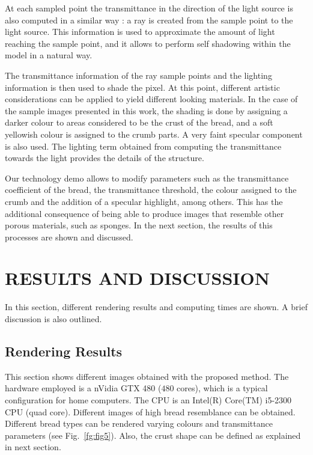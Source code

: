\documentclass[oneside,a4paper,english,links]{amca}
\begin{document}
At each sampled point the transmittance in the direction of the light
source is also computed in a similar way : a ray is created from the
sample point to the light source. This information is used to
approximate the amount of light reaching the sample point, and it
allows to perform self shadowing within the model in a natural
way. 

The transmittance information of the ray sample points and the
lighting information is then used to shade the pixel. At this point,
different artistic considerations can be applied to yield different
looking materials. In the case of the sample images presented
in this work, the shading is done by assigning a darker colour to areas
considered to be the crust of the bread, and a soft yellowish colour is
assigned to the crumb parts. A very faint specular component is also
used. The lighting term obtained from computing the transmittance
towards the light provides the details of the structure.

Our technology demo allows to modify parameters such as the
transmittance coefficient of the bread, the transmittance
threshold, the colour assigned to the crumb and the addition of a
specular highlight, among others. This has the additional consequence
of being able to produce images that resemble other porous materials,
such as sponges. In the next section, the results of this processes are shown and discussed.


\section{RESULTS AND DISCUSSION}

In this section, different rendering results and computing times are shown. A brief discussion is also outlined.

\subsection{Rendering Results}

This section shows different images obtained with the proposed method. The hardware employed is a nVidia GTX 480 ($480$ cores), which is a typical configuration for home computers. The CPU is an Intel(R) Core(TM) i5-2300 CPU (quad core). Different images of high bread resemblance can be obtained. Different bread types can be rendered varying colours and transmittance parameters (see Fig.~\ref{fg:fig5}). Also, the crust shape can be defined as explained in next section.
\end{document}
